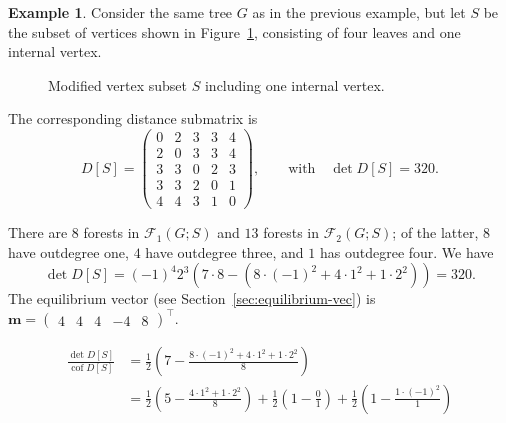 \documentclass[12pt]{amsart}
\theoremstyle{definition}
\newtheorem{eg}[thm]{Example}
\newcommand{\boldm}{\mathbf{m}}
\newcommand{\tr}{\intercal}
\DeclareMathOperator{\cof}{cof}
\newcommand{\forests}{\mathcal{F}}
\begin{document}
\begin{eg}
	Consider the same tree $G$ as in the previous example, but let $S$ be the subset of vertices shown in Figure~\ref{fig:tree-5-mod}, consisting of four leaves and one internal vertex.
\begin{figure}[h]
\centering
{}
\caption{Modified vertex subset $S$ including one internal vertex.}
\label{fig:tree-5-mod}
\end{figure}
The corresponding distance submatrix is
\[
	D[S] = \begin{pmatrix}
	0 & 2 & 3 & 3 & 4 \\
	2 & 0 & 3 & 3 & 4 \\
	3 & 3 & 0 & 2 & 3 \\
	3 & 3 & 2 & 0 & 1 \\
	4 & 4 & 3 & 1 & 0
	\end{pmatrix},
	\qquad\text{with}\quad
	\det D[S] = 320 .
\]

There are $8$ forests in $\forests_1(G; S)$ and $13$ forests in $\forests_2(G; S)$;
of the latter, $8$ have outdegree one, $4$ have outdegree three, and $1$ has outdegree four.
We have
\[
	\det D[S] = (-1)^4 2^3 \left(7 \cdot 8 - (8 \cdot (-1)^2 + 4 \cdot 1^2 + 1 \cdot 2^2) \right)
	= 320 .
\]
The equilibrium vector (see Section~\ref{sec:equilibrium-vec}) is 
$
	\boldm = \begin{pmatrix} 4 & 4 & 4 & -4 & 8 \end{pmatrix}^\tr .
$


\begin{align*}
	\frac{\det D[S]}{\cof D[S]} &= \frac{1}{2} \left(7 - \frac{8 \cdot (-1)^2 + 4 \cdot 1^2 + 1 \cdot 2^2}{8}\right) \\
	&= \frac{1}{2} \left(5 - \frac{4 \cdot 1^2 + 1 \cdot 2^2}{8}\right) + \frac{1}{2} \left(1 - \frac{0}{1}\right) + \frac{1}{2}\left(1 - \frac{1 \cdot (-1)^2}{1}\right)
\end{align*}


\end{eg}
\end{document}
